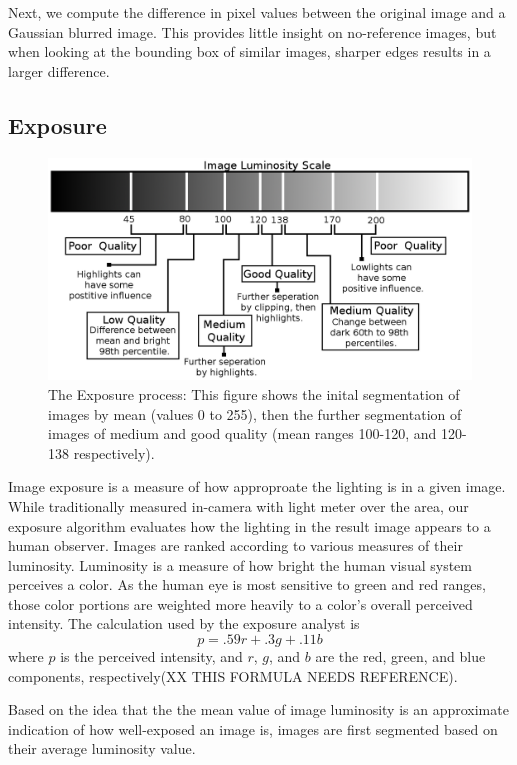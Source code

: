 \documentclass[10pt,twocolumn,letterpaper]{article}
\begin{document}
Next, we compute the difference in pixel values between the original image and a Gaussian blurred image. This provides little insight on no-reference images, but when looking at the bounding box of similar images, sharper edges results in a larger difference.

\subsection{Exposure}
\begin{figure}[t]
  \centering
    \includegraphics[scale=0.53,clip]{imageluminosity.eps}
  \caption{The Exposure process: This figure shows the inital segmentation of images by mean (values 0 to 255), then the further segmentation of images of medium and good quality (mean ranges 100-120, and 120-138 respectively).}
\end{figure}
Image exposure is a measure of how approproate the lighting is in a given image.  While traditionally measured in-camera with light meter over the area, our exposure algorithm evaluates how the lighting in the result image appears to a human observer.  Images are ranked according to various measures of their luminosity.  Luminosity is a measure of how bright the human visual system perceives a color. As the human eye is most sensitive to green and red ranges, those color portions are weighted more heavily to a color's overall perceived intensity. The calculation used by the exposure analyst is
\[
p=.59r+.3g+.11b
\]
where \(p\) is the perceived intensity, and \(r\), \(g\), and \(b\) are the red, green, and blue components, respectively(XX THIS FORMULA NEEDS REFERENCE).

Based on the idea that the the mean value of image luminosity is an approximate indication of how well-exposed an image is, images are first segmented based on their average luminosity value.
\end{document}
